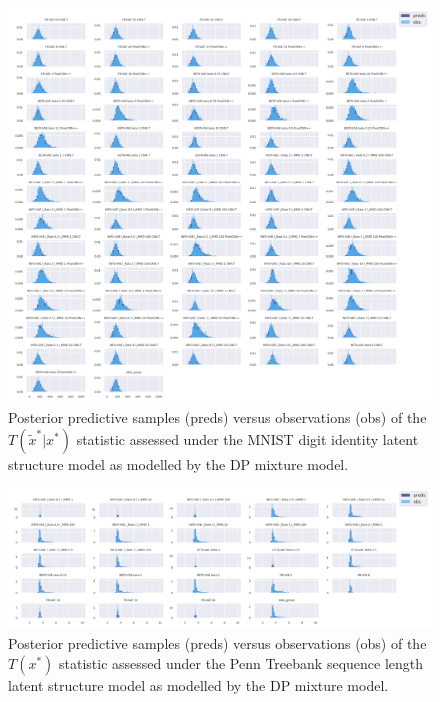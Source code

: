 \begin{figure}[!htb]
    \centering
    \includegraphics[width=\textwidth]{images/bda_checks/surprisal_dps/mnist_prediction_checks__conditional_conditional.png}
    \caption{Posterior predictive samples (preds) versus observations (obs) of the $T(\tilde x^* | x^*)$ statistic assessed under the MNIST digit identity latent structure model as modelled by the DP mixture model.}
    \label{fig:surprisal_check_mnist_con_con}
\end{figure}

\begin{figure}[!htb]
    \centering
    \includegraphics[width=\textwidth]{images/bda_checks/surprisal_dps/ptb_seq_len_prediction_checks__unconditional_unconditional.png}
    \caption{Posterior predictive samples (preds) versus observations (obs) of the $T(x^*)$ statistic assessed under the Penn Treebank sequence length latent structure model as modelled by the DP mixture model.}
    \label{fig:surprisal_check_ptb_seq_len_uncon_uncon}
\end{figure}

